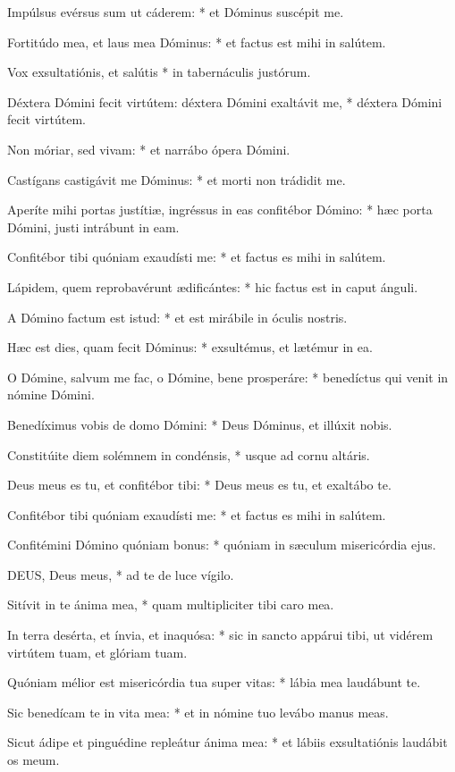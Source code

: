 Impúlsus evérsus sum ut cáderem: * et Dóminus suscépit me.

Fortitúdo mea, et laus mea Dóminus: * et factus est mihi in salútem.

Vox exsultatiónis, et salútis * in tabernáculis justórum.

Déxtera Dómini fecit virtútem: déxtera Dómini exaltávit me, * déxtera Dómini fecit virtútem.

Non móriar, sed vivam: * et narrábo ópera Dómini.

Castígans castigávit me Dóminus: * et morti non trádidit me.

Aperíte mihi portas justítiæ, ingréssus in eas confitébor Dómino: * hæc porta Dómini, justi intrábunt in eam.

Confitébor tibi quóniam exaudísti me: * et factus es mihi in salútem.

Lápidem, quem reprobavérunt ædificántes: * hic factus est in caput ánguli.

A Dómino factum est istud: * et est mirábile in óculis nostris.

Hæc est dies, quam fecit Dóminus: * exsultémus, et lætémur in ea.

O Dómine, salvum me fac, o Dómine, bene prosperáre: * benedíctus qui venit in nómine Dómini.

Benedíximus vobis de domo Dómini: * Deus Dóminus, et illúxit nobis.

Constitúite diem solémnem in condénsis, * usque ad cornu altáris.

Deus meus es tu, et confitébor tibi: * Deus meus es tu, et exaltábo te.

Confitébor tibi quóniam exaudísti me: * et factus es mihi in salútem.

Confitémini Dómino quóniam bonus: * quóniam in sæculum misericórdia ejus.


\lettrine[lines=2]{D}{EUS}, Deus meus, * ad te de luce vígilo.

Sitívit in te ánima mea, * quam multipliciter tibi caro mea.

In terra desérta, et ínvia, et inaquósa: * sic in sancto appárui tibi, ut vidérem virtútem tuam, et glóriam tuam.

Quóniam mélior est misericórdia tua super vitas: * lábia mea laudábunt te.

Sic benedícam te in vita mea: * et in nómine tuo levábo manus meas.

Sicut ádipe et pinguédine repleátur ánima mea: * et lábiis exsultatiónis laudábit os meum.

